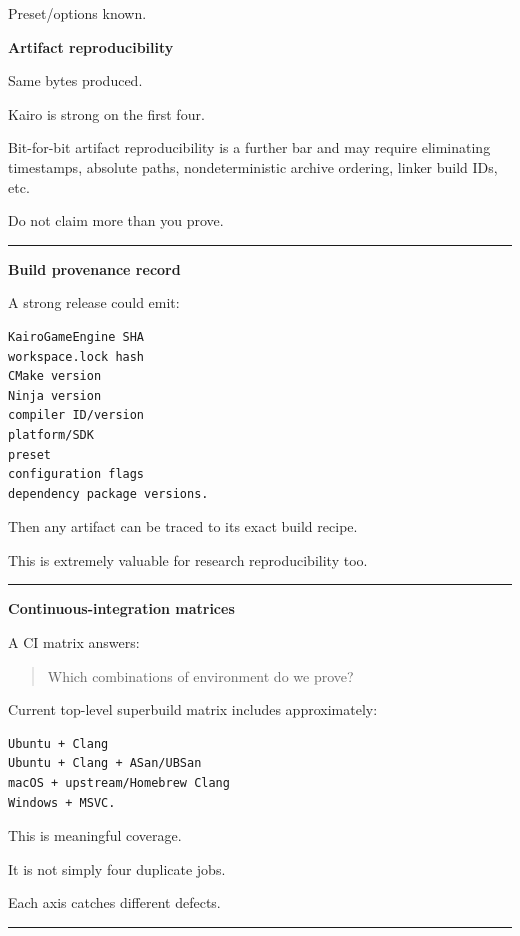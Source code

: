 Preset/options known.

\textbf{Artifact reproducibility}

Same bytes produced.

Kairo is strong on the first four.

Bit-for-bit artifact reproducibility is a further bar and may require eliminating timestamps, absolute paths, nondeterministic archive ordering, linker build IDs, etc.

Do not claim more than you prove.

\begin{center}\rule{0.5\linewidth}{0.5pt}\end{center}

\textbf{Build provenance record}

A strong release could emit:

\begin{verbatim}
KairoGameEngine SHA
workspace.lock hash
CMake version
Ninja version
compiler ID/version
platform/SDK
preset
configuration flags
dependency package versions.
\end{verbatim}

Then any artifact can be traced to its exact build recipe.

This is extremely valuable for research reproducibility too.

\begin{center}\rule{0.5\linewidth}{0.5pt}\end{center}

\textbf{Continuous-integration matrices}

A CI matrix answers:

\begin{quote}
Which combinations of environment do we prove?
\end{quote}

Current top-level superbuild matrix includes approximately:

\begin{verbatim}
Ubuntu + Clang
Ubuntu + Clang + ASan/UBSan
macOS + upstream/Homebrew Clang
Windows + MSVC.
\end{verbatim}

This is meaningful coverage.

It is not simply four duplicate jobs.

Each axis catches different defects.

\begin{center}\rule{0.5\linewidth}{0.5pt}\end{center}

